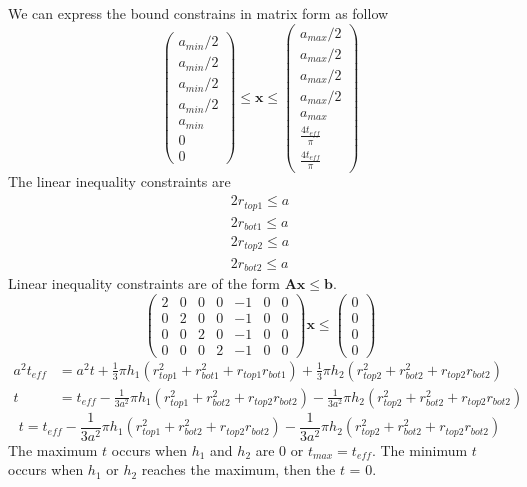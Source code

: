 \documentclass[12pt]{article}
\numberwithin{equation}{section}
\numberwithin{equation}{section}
\begin{document}
\begin{outline}[enumerate]
We can express the bound constrains in matrix form as follow
\begin{equation}
\left(
\begin{matrix}
a_{min}/2\\ 
a_{min}/2\\ 
a_{min}/2\\ 
a_{min}/2\\
a_{min}\\ 
0 \\
0 
\end{matrix} \right )
\leq \mathbf{x}
 \leq 
 \left(
\begin{matrix}
a_{max}/2 \\ a_{max}/2 \\ a_{max}/2 \\ a_{max}/2 \\ a_{max} \\ \frac{4 t_{eff}}{\pi} \\ \frac{4 t_{eff}}{\pi}
\end{matrix} \right )
\end{equation}
The linear inequality constraints are 
\begin{align*} 
2r_{top1} \leq a \\
2r_{bot1} \leq a\\
2r_{top2} \leq a\\
2r_{bot2} \leq a 
\end{align*}
Linear inequality constraints are of the form $\mathbf{A} \mathbf{x} \leq \mathbf{b}$.
\setcounter{MaxMatrixCols}{20}
\begin{equation}
\left(
\begin{matrix}
2 & 0 & 0 & 0 & -1 & 0 & 0  \\
0 & 2 & 0 & 0 & -1 & 0 & 0 \\
0 & 0 & 2 & 0 & -1& 0 & 0 \\
0 & 0 & 0 & 2 & -1& 0 & 0
\end{matrix}
\right ) \mathbf{x}  \leq \left ( \begin{matrix} 0\\ 0\\ 0\\ 0 \end{matrix} \right ) 
\end{equation}
\begin{align}
a^2 t_{eff} &= a^2 t + \frac{1}{3}\pi h_1(r_{top1}^2+r_{bot1}^2+r_{top1}r_{bot1})+\frac{1}{3}\pi h_2(r_{top2}^2+r_{bot2}^2+r_{top2}r_{bot2})\nonumber \\
t &= t_{eff} - \frac{1}{3a^2}\pi h_1(r_{top1}^2+r_{bot2}^2+r_{top2}r_{bot2}) - \frac{1}{3a^2}\pi h_2(r_{top2}^2+r_{bot2}^2+r_{top2}r_{bot2})
 \end{align} 
\begin{equation}
\boxed{t = t_{eff} - \frac{1}{3a^2}\pi h_1(r_{top1}^2+r_{bot2}^2+r_{top2}r_{bot2}) - \frac{1}{3a^2}\pi h_2(r_{top2}^2+r_{bot2}^2+r_{top2}r_{bot2})}
\end{equation}
The maximum $t$ occurs when $h_{1}$ and $h_{2}$ are 0 or $t_{max}=t_{eff}$.  
The minimum $t$ occurs when $h_{1}$ or $h_{2}$ reaches the maximum, then the $t$ = 0.



\end{outline}
\end{document}
